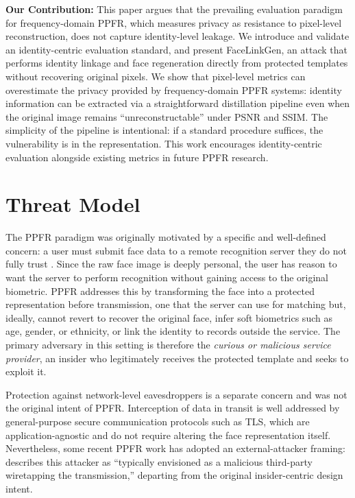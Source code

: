 \textbf{Our Contribution:} This paper argues that the prevailing evaluation paradigm for frequency-domain PPFR, which measures privacy as resistance to pixel-level reconstruction, does not capture identity-level leakage. We introduce and validate an identity-centric evaluation standard, and present FaceLinkGen, an attack that performs identity linkage and face regeneration directly from protected templates without recovering original pixels. We show that pixel-level metrics can overestimate the privacy provided by frequency-domain PPFR systems: identity information can be extracted via a straightforward distillation pipeline even when the original image remains ``unreconstructable'' under PSNR and SSIM. The simplicity of the pipeline is intentional: if a standard procedure suffices, the vulnerability is in the representation. This work encourages identity-centric evaluation alongside existing metrics in future PPFR research.






\section{Threat Model}
The PPFR paradigm was originally motivated by a specific and well-defined concern: a user must submit face data to a remote recognition server they do not fully trust \citep{erkin_privacy-preserving_2009}. Since the raw face image is deeply personal, the user has reason to want the server to perform recognition without gaining access to the original biometric. PPFR addresses this by transforming the face into a protected representation before transmission, one that the server can use for matching but, ideally, cannot revert to recover the original face, infer soft biometrics such as age, gender, or ethnicity, or link the identity to records outside the service. The primary adversary in this setting is therefore the \emph{curious or malicious service provider}, an insider who legitimately receives the protected template and seeks to exploit it.

Protection against network-level eavesdroppers is a separate concern and was not the original intent of PPFR. Interception of data in transit is well addressed by general-purpose secure communication protocols such as TLS, which are application-agnostic and do not require altering the face representation itself. Nevertheless, some recent PPFR work has adopted an external-attacker framing: \citet{mi_privacy-preserving_2024} describes this attacker as ``typically envisioned as a malicious third-party wiretapping the transmission,'' departing from the original insider-centric design intent.

